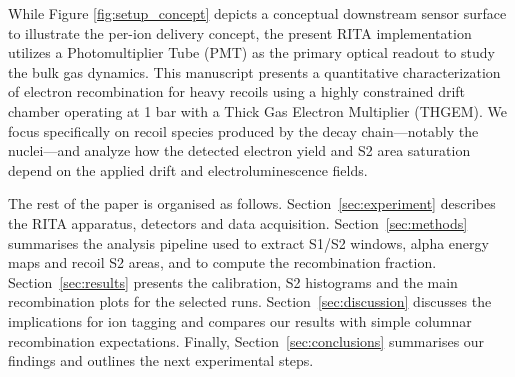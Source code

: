 While Figure \ref{fig:setup_concept} depicts a conceptual downstream sensor surface to illustrate
the per-ion delivery concept, the present RITA implementation utilizes a Photomultiplier Tube (PMT)
as the primary optical readout to study the bulk gas dynamics. This manuscript presents a
quantitative characterization of electron recombination for heavy recoils using a highly
constrained drift chamber operating at 1 bar with a Thick Gas Electron Multiplier (THGEM). We focus
specifically on recoil species produced by the  decay chain—notably the
 nuclei—and analyze how the detected electron yield and S2 area saturation depend
on the applied drift and electroluminescence fields.


The rest of the paper is organised as follows. Section~\ref{sec:experiment} describes the RITA
apparatus, detectors and data acquisition. Section~\ref{sec:methods} summarises the analysis
pipeline used to extract S1/S2 windows, alpha energy maps and recoil S2 areas, and to compute the
recombination fraction. Section~\ref{sec:results} presents the calibration, S2 histograms and the
main recombination plots for the selected runs. Section~\ref{sec:discussion} discusses the
implications for ion tagging and compares our results with simple columnar recombination
expectations. Finally, Section~\ref{sec:conclusions} summarises our findings and outlines the next
experimental steps.
